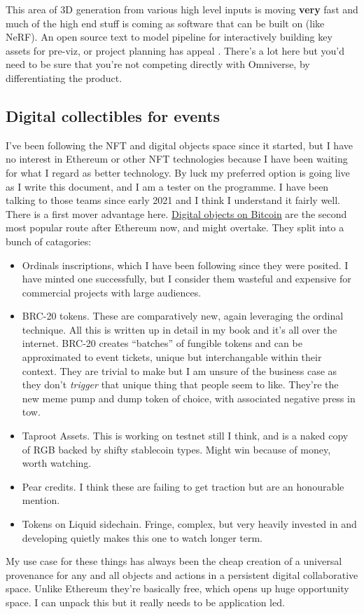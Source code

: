 This area of 3D generation from various high level inputs is moving \textbf{very} fast and much of the high end stuff is coming as software that can be built on (like NeRF). An open source text to model pipeline for interactively building key assets for pre-viz, or project planning has appeal  \cite{poole2022dreamfusion}.
There's a lot here but you'd need to be sure that you're not competing directly with Omniverse, by differentiating the product.

\subsection{Digital collectibles for events}
I've been following the NFT and digital objects space since it started, but I have no interest in Ethereum or other NFT technologies because I have been waiting for what I regard as better technology. By luck my preferred option is going live as I write this document, and I am a tester on the programme. I have been talking to those teams since early 2021 and I think I understand it fairly well. There is a first mover advantage here. \href{https://coinmarketcap.com/alexandria/article/bitcoin-is-now-the-second-most-popular-blockchain-for-nfts}{Digital objects on Bitcoin} are the second most popular route after Ethereum now, and might overtake. They split into a bunch of catagories:
\begin{itemize}
\item Ordinals inscriptions, which I have been following since they were posited. I have minted one successfully, but I consider them wasteful and expensive for commercial projects with large audiences.
\item BRC-20 tokens. These are comparatively new, again leveraging the ordinal technique. All this is written up in detail in my book and it's all over the internet. BRC-20 creates ``batches'' of fungible tokens and can be approximated to event tickets, unique but interchangable within their context. They are trivial to make but I am unsure of the business case as they don't \textit{trigger} that unique thing that people seem to like. They're the new meme pump and dump token of choice, with associated negative press in tow.
\item Taproot Assets. This is working on testnet still I think, and is a naked copy of RGB backed by shifty stablecoin types. Might win because of money, worth watching.
\item Pear credits. I think these are failing to get traction but are an honourable mention.
\item Tokens on Liquid sidechain. Fringe, complex, but very heavily invested in and developing quietly makes this one to watch longer term.
\end{itemize}
My use case for these things has always been the cheap creation of a universal provenance for any and all objects and actions in a persistent digital collaborative space. Unlike Ethereum they're basically free, which opens up huge opportunity space. I can unpack this but it really needs to be application led.
